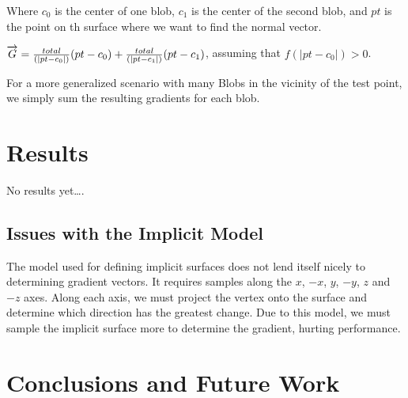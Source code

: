 \documentclass[conference]{acmsiggraph}
\begin{document}
Where $c_0$ is the center of one blob, $c_1$ is the center of the second blob,
and $pt$ is the point on th surface where we want to find the normal vector.

$\overrightarrow{G} = {total\over (|pt - c_0|)}(pt - c_0) + {total\over (|pt -
c_1|)}(pt - c_1)$, assuming that $f(|pt - c_0|) > 0$.

For a more generalized scenario with many Blobs in the vicinity of the test
point, we simply sum the resulting gradients for each blob.






\section{Results}
No results yet\ldots.

\subsection{Issues with the Implicit Model}
The model used for defining implicit surfaces does not lend itself nicely to
determining gradient vectors. It requires samples along the $x$, $-x$, $y$,
$-y$, $z$ and $-z$ axes. Along each axis, we must project the vertex onto
the surface and determine which direction has the greatest change. Due to this
model, we must sample the implicit surface more to determine the gradient,
hurting performance.


\section{Conclusions and Future Work}




\end{document}
